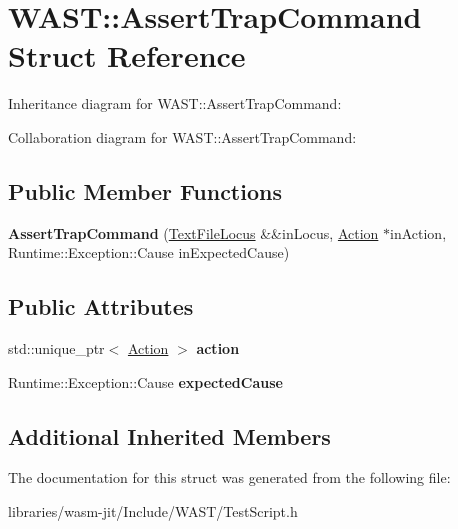 \hypertarget{struct_w_a_s_t_1_1_assert_trap_command}{}\section{W\+A\+ST\+:\+:Assert\+Trap\+Command Struct Reference}
\label{struct_w_a_s_t_1_1_assert_trap_command}


Inheritance diagram for W\+A\+ST\+:\+:Assert\+Trap\+Command\+:


Collaboration diagram for W\+A\+ST\+:\+:Assert\+Trap\+Command\+:
\subsection*{Public Member Functions}
\begin{DoxyCompactItemize}
\item 
\mbox{\label{struct_w_a_s_t_1_1_assert_trap_command_a5f510074d6411c02fcd2ddeec3ed99da}} 
{\bfseries Assert\+Trap\+Command} (\mbox{\hyperlink{struct_w_a_s_t_1_1_text_file_locus}{Text\+File\+Locus}} \&\&in\+Locus, \mbox{\hyperlink{struct_w_a_s_t_1_1_action}{Action}} $\ast$in\+Action, Runtime\+::\+Exception\+::\+Cause in\+Expected\+Cause)
\end{DoxyCompactItemize}
\subsection*{Public Attributes}
\begin{DoxyCompactItemize}
\item 
\mbox{\label{struct_w_a_s_t_1_1_assert_trap_command_a90341ef97bd75c36593b246bf9bde8eb}} 
std\+::unique\+\_\+ptr$<$ \mbox{\hyperlink{struct_w_a_s_t_1_1_action}{Action}} $>$ {\bfseries action}
\item 
\mbox{\label{struct_w_a_s_t_1_1_assert_trap_command_a3ecfcb3a06cb2016e846d5aa18d32031}} 
Runtime\+::\+Exception\+::\+Cause {\bfseries expected\+Cause}
\end{DoxyCompactItemize}
\subsection*{Additional Inherited Members}


The documentation for this struct was generated from the following file\+:\begin{DoxyCompactItemize}
\item 
libraries/wasm-\/jit/\+Include/\+W\+A\+S\+T/Test\+Script.\+h\end{DoxyCompactItemize}
